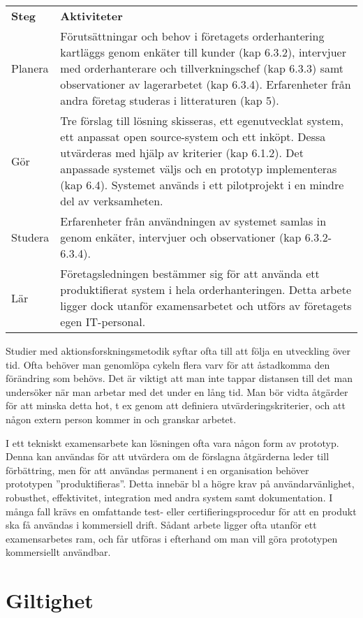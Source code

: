 \begin{longtable}[]{@{}ll@{}}
\toprule
\textbf{Steg} & \textbf{Aktiviteter}\tabularnewline
Planera & Förutsättningar och behov i företagets orderhantering
kartläggs genom enkäter till kunder (kap 6.3.2), intervjuer med
orderhanterare och tillverkningschef (kap 6.3.3) samt observationer av
lagerarbetet (kap 6.3.4). Erfarenheter från andra företag studeras i
litteraturen (kap 5).\tabularnewline
Gör & Tre förslag till lösning skisseras, ett egenutvecklat system, ett
anpassat open source-system och ett inköpt. Dessa utvärderas med hjälp
av kriterier (kap 6.1.2). Det anpassade systemet väljs och en prototyp
implementeras (kap 6.4). Systemet används i ett pilotprojekt i en mindre
del av verksamheten.\tabularnewline
Studera & Erfarenheter från användningen av systemet samlas in genom
enkäter, intervjuer och observationer (kap 6.3.2-6.3.4).\tabularnewline
Lär & Företagsledningen bestämmer sig för att använda ett produktifierat
system i hela orderhanteringen. Detta arbete ligger dock utanför
examensarbetet och utförs av företagets egen IT-personal.\tabularnewline
\bottomrule
\end{longtable}

Studier med aktionsforskningsmetodik syftar ofta till att följa en
utveckling över tid. Ofta behöver man genomlöpa cykeln flera varv för
att åstadkomma den förändring som behövs. Det är viktigt att man inte
tappar distansen till det man undersöker när man arbetar med det under
en lång tid. Man bör vidta åtgärder för att minska detta hot, t ex genom
att definiera utvärderingskriterier, och att någon extern person kommer
in och granskar arbetet.

I ett tekniskt examensarbete kan lösningen ofta vara någon form av
prototyp. Denna kan användas för att utvärdera om de förslagna
åtgärderna leder till förbättring, men för att användas permanent i en
organisation behöver prototypen ''produktifieras''. Detta innebär bl a
högre krav på användarvänlighet, robusthet, effektivitet, integration
med andra system samt dokumentation. I många fall krävs en omfattande
test- eller certifieringsprocedur för att en produkt ska få användas i
kommersiell drift. Sådant arbete ligger ofta utanför ett examensarbetes
ram, och får utföras i efterhand om man vill göra prototypen
kommersiellt användbar.

\section{Giltighet}\label{giltighet}

